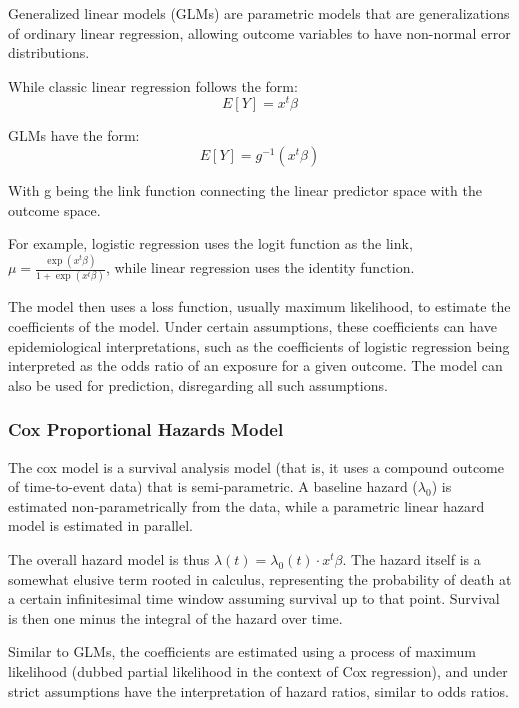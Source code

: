 \documentclass[a4paper,12pt]{article}
\begin{document}
			Generalized linear models (GLMs) are parametric models that are generalizations of ordinary linear regression, allowing outcome variables to have non-normal error distributions\cite{Nelder1972}.
			
			While classic linear regression follows the form:
			\begin{equation*}
			E[Y] = x^t \beta
			\end{equation*}
			
			GLMs have the form:
			\begin{equation*}
			E[Y] = g^{-1} (x^t \beta)
			\end{equation*}
			
			With g being the link function connecting the linear predictor space with the outcome space.
			
			For example, logistic regression uses the logit function as the link, $ \mu = \frac{\exp (x^t \beta)}{1 + \exp (x^t \beta)} $, while linear regression uses the identity function.
			
			The model then uses a loss function, usually maximum likelihood, to estimate the coefficients of the model. Under certain assumptions, these coefficients can have epidemiological interpretations, such as the coefficients of logistic regression being interpreted as the odds ratio of an exposure for a given outcome. The model can also be used for prediction, disregarding all such assumptions.
			
			\subsubsection{Cox Proportional Hazards Model}
			
			The cox model is a survival analysis model (that is, it uses a compound outcome of time-to-event data) that is semi-parametric. A baseline hazard ($ \lambda_0 $) is estimated non-parametrically from the data, while a parametric linear hazard model is estimated in parallel\cite{Cox1972}.
			
			The overall hazard model is thus $ \lambda(t) = \lambda_0(t) \cdot x^t \beta $. The hazard itself is a somewhat elusive term rooted in calculus, representing the probability of death at a certain infinitesimal time window assuming survival up to that point. Survival is then one minus the integral of the hazard over time.
			
			Similar to GLMs, the coefficients are estimated using a process of maximum likelihood (dubbed partial likelihood in the context of Cox regression), and under strict assumptions have the interpretation of hazard ratios, similar to odds ratios.
			
\end{document}
